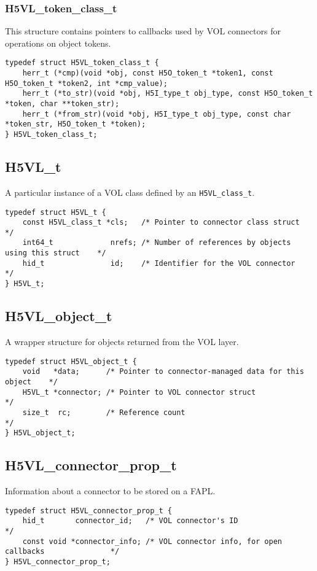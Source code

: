 \subsubsection{H5VL\_token\_class\_t}

This structure contains pointers to callbacks used by VOL connectors for operations on object tokens.
\begin{verbatim}
typedef struct H5VL_token_class_t {
    herr_t (*cmp)(void *obj, const H5O_token_t *token1, const H5O_token_t *token2, int *cmp_value);
    herr_t (*to_str)(void *obj, H5I_type_t obj_type, const H5O_token_t *token, char **token_str);
    herr_t (*from_str)(void *obj, H5I_type_t obj_type, const char *token_str, H5O_token_t *token);
} H5VL_token_class_t;

\end{verbatim}






\subsection{H5VL\_t}

A particular instance of a VOL class defined by an \texttt{H5VL\_class\_t}.

\begin{verbatim}
typedef struct H5VL_t {
    const H5VL_class_t *cls;   /* Pointer to connector class struct                    */
    int64_t             nrefs; /* Number of references by objects using this struct    */
    hid_t               id;    /* Identifier for the VOL connector                     */
} H5VL_t;
\end{verbatim}


\subsection{H5VL\_object\_t}

A wrapper structure for objects returned from the VOL layer.

\begin{verbatim}
typedef struct H5VL_object_t {
    void   *data;      /* Pointer to connector-managed data for this object    */
    H5VL_t *connector; /* Pointer to VOL connector struct                      */
    size_t  rc;        /* Reference count                                      */
} H5VL_object_t;
\end{verbatim}

\subsection{H5VL\_connector\_prop\_t}

Information about a connector to be stored on a FAPL.

\begin{verbatim}
typedef struct H5VL_connector_prop_t {
    hid_t       connector_id;   /* VOL connector's ID                                   */
    const void *connector_info; /* VOL connector info, for open callbacks               */
} H5VL_connector_prop_t;
\end{verbatim}
